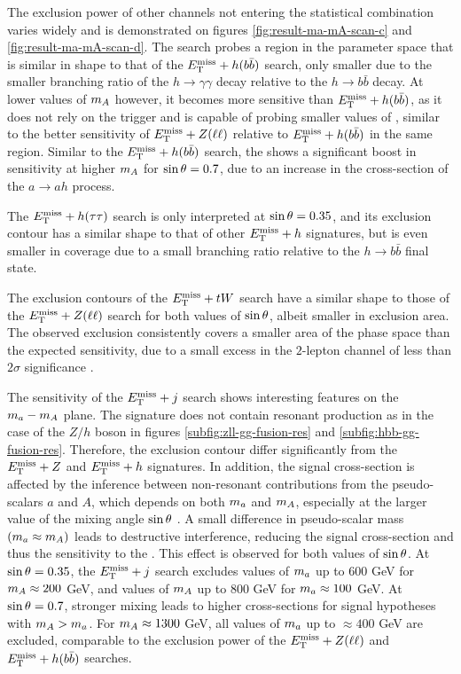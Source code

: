 The exclusion power of other channels not entering the statistical combination varies widely and is demonstrated on figures \ref{fig:result-ma-mA-scan-c} and \ref{fig:result-ma-mA-scan-d}. The \monohgamgam search probes a region in the parameter space that is similar in shape to that of the $E_{\mathrm{T}}^{\mathrm{miss}}+h(b\bar{b})$ search, only smaller due to the smaller branching ratio of the $h\rightarrow \gamma\gamma$ decay relative to the $h\rightarrow b\bar{b}$ decay. At lower values of $m_A$ however, it becomes more sensitive than $E_{\mathrm{T}}^{\mathrm{miss}}+h(b\bar{b})$, as it does not rely on the \met trigger and is capable of probing smaller values of \met, similar to the better sensitivity of $E_{\mathrm{T}}^{\mathrm{miss}}+Z(\ell\ell)$ relative to $E_{\mathrm{T}}^{\mathrm{miss}}+h(b\bar{b})$ in the same region. Similar to the $E_{\mathrm{T}}^{\mathrm{miss}}+h(b\bar{b})$ search, the \monohgamgam shows a significant boost in sensitivity at higher $m_A$ for $\sin\theta=0.7$, due to an increase in the cross-section of the $a\rightarrow ah$ process. 

The $E_{\mathrm{T}}^{\mathrm{miss}}+h(\tau\tau)$ search is only interpreted at $\sin\theta = 0.35$, and its exclusion contour has a similar shape to that of other $E_{\mathrm{T}}^{\mathrm{miss}}+h$ signatures, but is even smaller in coverage due to a small branching ratio relative to the $h\rightarrow b\bar{b}$ final state. 

The exclusion contours of the $E_{\mathrm{T}}^{\mathrm{miss}}+tW$ search have a similar shape to those of the $E_{\mathrm{T}}^{\mathrm{miss}}+Z(\ell\ell)$ search for both values of $\sin\theta$, albeit smaller in exclusion area. The observed exclusion consistently covers a smaller area of the phase space than the expected sensitivity, due to a small excess in the $2$-lepton channel of less than $2\sigma$ significance \cite{EXOT-2018-43}. 

The sensitivity of the $E_{\mathrm{T}}^{\mathrm{miss}}+j$ search shows interesting features on the $m_a-m_A$ plane. The signature does not contain resonant production as in the case of the $Z/h$ boson in figures \ref{subfig:zll-gg-fusion-res} and \ref{subfig:hbb-gg-fusion-res}. Therefore, the exclusion contour differ significantly from the $E_{\mathrm{T}}^{\mathrm{miss}}+Z$ and $E_{\mathrm{T}}^{\mathrm{miss}}+h$ signatures. In addition, the signal cross-section is affected by the inference between non-resonant contributions from the pseudo-scalars $a$ and $A$, which depends on both $m_a$ and $m_A$, especially at the larger value of the mixing angle $\sin\theta$ \cite{Bauer:2017ota}. A small difference in pseudo-scalar mass $(m_a\approx m_A)$ leads to destructive interference, reducing the signal cross-section and thus the sensitivity to the \hdma. This effect is observed for both values of $\sin\theta$. At $\sin\theta=0.35$, the $E_{\mathrm{T}}^{\mathrm{miss}}+j$ search excludes values of $m_a$ up to 600 GeV for $m_A\approx 200$ GeV, and values of $m_A$ up to 800 GeV for $m_a\approx 100 $ GeV. At $\sin\theta=0.7$, stronger mixing leads to higher cross-sections for signal hypotheses with $m_A>m_a$. For $m_A\approx 1300$ GeV, all values of $m_a$ up to $\approx 400$ GeV are excluded, comparable to the exclusion power of the $E_{\mathrm{T}}^{\mathrm{miss}}+Z(\ell\ell)$ and $E_{\mathrm{T}}^{\mathrm{miss}}+h(b\bar{b})$ searches. 

